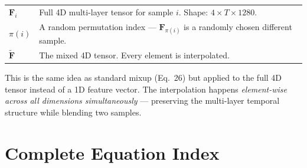 \documentclass[12pt, a4paper]{article}
\begin{document}
\begin{explainbox}
\begin{tabular}{lp{11cm}}
$\mathbf{F}_i$ & Full 4D multi-layer tensor for sample $i$. Shape: $4 \times T \times 1280$.\\[0.2cm]
$\pi(i)$ & A random permutation index --- $\mathbf{F}_{\pi(i)}$ is a randomly chosen different sample.\\[0.2cm]
$\tilde{\mathbf{F}}$ & The mixed 4D tensor. Every element is interpolated.
\end{tabular}

This is the same idea as standard mixup (Eq.~26) but applied to the full 4D tensor instead of a 1D feature vector. The interpolation happens \textit{element-wise across all dimensions simultaneously} --- preserving the multi-layer temporal structure while blending two samples.
\end{explainbox}


\newpage
\section{Complete Equation Index}
\end{document}
